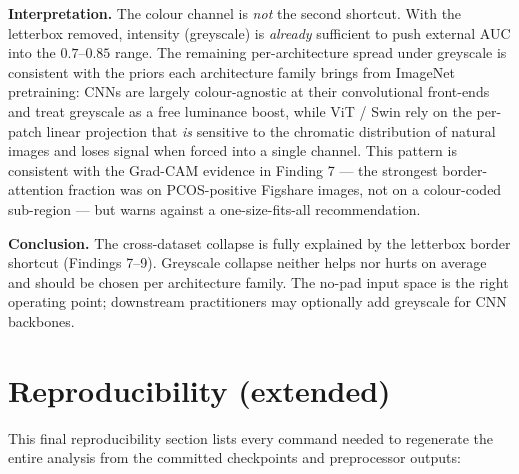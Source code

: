 \documentclass[11pt]{article}
\begin{document}
\textbf{Interpretation.} The colour channel is \emph{not} the second
shortcut. With the letterbox removed, intensity (greyscale) is
\emph{already} sufficient to push external AUC into the $0.7$--$0.85$
range. The remaining per-architecture spread under greyscale is
consistent with the priors each architecture family brings from
ImageNet pretraining: CNNs are largely colour-agnostic at their
convolutional front-ends and treat greyscale as a free luminance
boost, while ViT / Swin rely on the per-patch linear projection that
\emph{is} sensitive to the chromatic distribution of natural images and
loses signal when forced into a single channel. This pattern is
consistent with the Grad-CAM evidence in Finding 7 — the strongest
border-attention fraction was on PCOS-positive Figshare images, not on
a colour-coded sub-region — but warns against a one-size-fits-all
recommendation.

\textbf{Conclusion.} The cross-dataset collapse is fully explained by
the letterbox border shortcut (Findings 7--9). Greyscale collapse
neither helps nor hurts on average and should be chosen per
architecture family. The no-pad input space is the right operating
point; downstream practitioners may optionally add greyscale for CNN
backbones.

\clearpage

\section*{Reproducibility (extended)}

This final reproducibility section lists every command needed to regenerate
the entire analysis from the committed checkpoints and preprocessor outputs:
\end{document}
